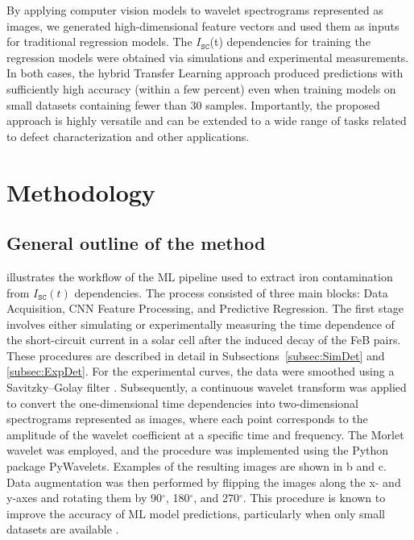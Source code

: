 \documentclass[10pt]{iopart}
\begin{document}
By applying computer vision models to wavelet spectrograms represented as images, we generated high-dimensional feature vectors and used them as inputs for traditional regression models.
The $I_\mathtt{SC}$(t) dependencies for training the regression models were obtained via simulations and experimental measurements.
In both cases, the hybrid Transfer Learning approach produced predictions with sufficiently high accuracy (within a few percent) even when training models 
on small datasets containing fewer than 30 samples.
Importantly, the proposed approach is highly versatile and can be extended to a wide range of tasks related to defect characterization and other applications.


\section{Methodology}\label{sec:Exp}

\subsection{General outline of the method}\label{subsec:GenSch}

 illustrates the workflow of the ML pipeline used to extract iron contamination from $I_\mathtt{SC}(t)$ dependencies.
The process consisted of three main blocks: Data Acquisition, CNN Feature Processing, and Predictive Regression.
The first stage involves either simulating or experimentally measuring the time dependence
of the short-circuit current in a solar cell after the induced decay of the FeB pairs.
These procedures are described in detail in Subsections~\ref{subsec:SimDet} and \ref{subsec:ExpDet}.
For the experimental curves, the data were smoothed using a Savitzky–Golay filter \cite{Krishnan2013}.
Subsequently, a continuous wavelet transform \cite{Torrence1998} was applied to convert the one-dimensional time dependencies
into two-dimensional spectrograms represented as images,
where each point corresponds to the amplitude of the wavelet coefficient at a specific time and frequency.
The Morlet wavelet was employed, and the procedure was implemented using the Python package PyWavelets.
Examples of the resulting images are shown in b and c.
Data augmentation was then performed by flipping the images along the x- and y-axes and rotating them by 90$^{\circ}$, 180$^{\circ}$, and 270$^{\circ}$.
This procedure is known to improve the accuracy of ML model predictions, particularly when only small datasets are available \cite{Ahmad2020}.
\end{document}
